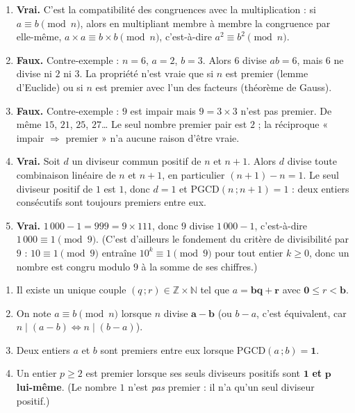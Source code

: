 \documentclass[11pt]{article}
\newcommand{\cle}[1]{{\popxbold\color{popdark}#1}}
\begin{document}
\begin{corrige}
\begin{enumerate}
\item \textbf{Vrai.} C'est la compatibilité des congruences avec la multiplication : si $a \equiv b \pmod{n}$, alors en multipliant membre à membre la congruence par elle-même, $a \times a \equiv b \times b \pmod{n}$, c'est-à-dire $a^2 \equiv b^2 \pmod{n}$.
\item \textbf{Faux.} Contre-exemple : $n = 6$, $a = 2$, $b = 3$. Alors $6$ divise $ab = 6$, mais $6$ ne divise ni $2$ ni $3$. La propriété n'est vraie que si $n$ est \cle{premier} (lemme d'Euclide) ou si $n$ est premier avec l'un des facteurs (théorème de Gauss).
\item \textbf{Faux.} Contre-exemple : $9$ est impair mais $9 = 3 \times 3$ n'est pas premier. De même $15$, $21$, $25$, $27$\dots{} Le seul nombre premier pair est $2$ ; la réciproque « impair $\Rightarrow$ premier » n'a aucune raison d'être vraie.
\item \textbf{Vrai.} Soit $d$ un diviseur commun positif de $n$ et $n+1$. Alors $d$ divise toute combinaison linéaire de $n$ et $n+1$, en particulier $(n+1) - n = 1$. Le seul diviseur positif de $1$ est $1$, donc $d = 1$ et $\mathrm{PGCD}(n\,;n+1) = 1$ : deux entiers consécutifs sont toujours premiers entre eux.
\item \textbf{Vrai.} $1\,000 - 1 = 999 = 9 \times 111$, donc $9$ divise $1\,000 - 1$, c'est-à-dire $1\,000 \equiv 1 \pmod{9}$. (C'est d'ailleurs le fondement du critère de divisibilité par $9$ : $10 \equiv 1 \pmod{9}$ entraîne $10^k \equiv 1 \pmod{9}$ pour tout entier $k \ge 0$, donc un nombre est congru modulo $9$ à la somme de ses chiffres.)
\end{enumerate}
\end{corrige}

\begin{corrige}
\begin{enumerate}
\item Il existe un unique couple $(q\,;r) \in \mathbb{Z} \times \mathbb{N}$ tel que $a = \mathbf{bq + r}$ avec $\mathbf{0} \le r < \mathbf{b}$.
\item On note $a \equiv b \pmod{n}$ lorsque $n$ divise $\mathbf{a - b}$ (ou $b - a$, c'est équivalent, car $n \mid (a-b) \Leftrightarrow n \mid (b-a)$).
\item Deux entiers $a$ et $b$ sont premiers entre eux lorsque $\mathrm{PGCD}(a\,;b) = \mathbf{1}$.
\item Un entier $p \ge 2$ est premier lorsque ses seuls diviseurs positifs sont $\mathbf{1}$ \textbf{et} $\mathbf{p}$ \textbf{lui-même}. (Le nombre $1$ n'est \emph{pas} premier : il n'a qu'un seul diviseur positif.)
\end{enumerate}
\end{corrige}
\end{document}
